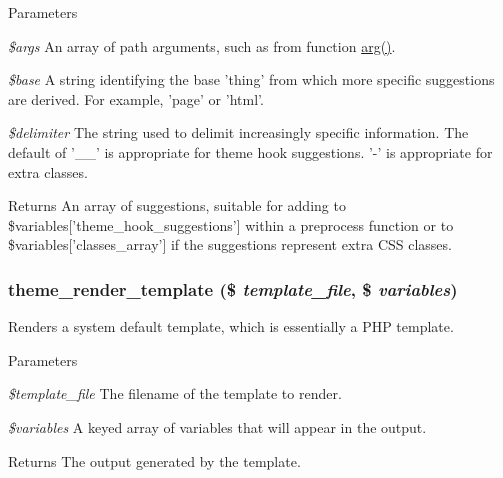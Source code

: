 \begin{DoxyParams}{Parameters}
\item[{\em \$args}]An array of path arguments, such as from function \hyperlink{bootstrap_8inc_afd40bf1dc5dc1f68fb326a8f6e0b88da}{arg()}. \item[{\em \$base}]A string identifying the base 'thing' from which more specific suggestions are derived. For example, 'page' or 'html'. \item[{\em \$delimiter}]The string used to delimit increasingly specific information. The default of '\_\-\_\-' is appropriate for theme hook suggestions. '-\/' is appropriate for extra classes.\end{DoxyParams}
\begin{DoxyReturn}{Returns}
An array of suggestions, suitable for adding to \$variables\mbox{[}'theme\_\-hook\_\-suggestions'\mbox{]} within a preprocess function or to \$variables\mbox{[}'classes\_\-array'\mbox{]} if the suggestions represent extra CSS classes. 
\end{DoxyReturn}
\hypertarget{includes_2theme_8inc_a726ca00e65b455bb895c8abf1dfb1df2}{
\subsubsection[{theme\_\-render\_\-template}]{\setlength{\rightskip}{0pt plus 5cm}theme\_\-render\_\-template (\$ {\em template\_\-file}, \/  \$ {\em variables})}}
\label{includes_2theme_8inc_a726ca00e65b455bb895c8abf1dfb1df2}
Renders a system default template, which is essentially a PHP template.


\begin{DoxyParams}{Parameters}
\item[{\em \$template\_\-file}]The filename of the template to render. \item[{\em \$variables}]A keyed array of variables that will appear in the output.\end{DoxyParams}
\begin{DoxyReturn}{Returns}
The output generated by the template. 
\end{DoxyReturn}
